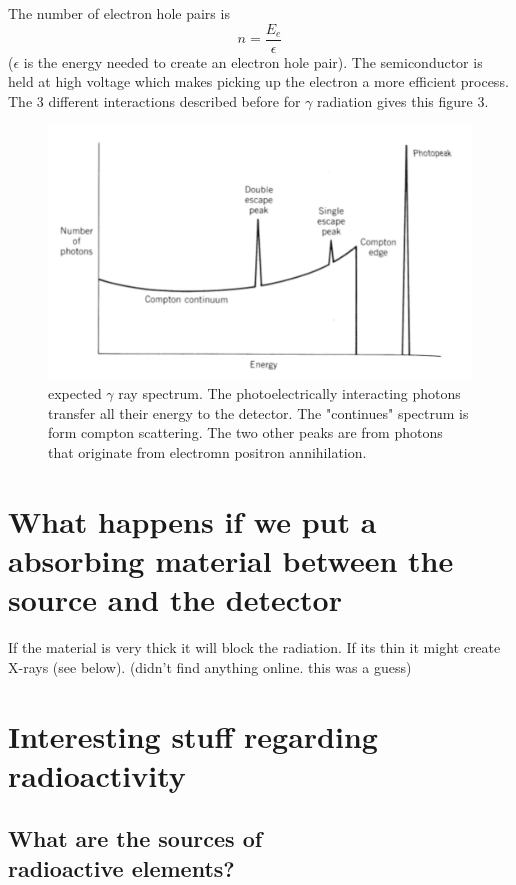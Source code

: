 \documentclass[]{article}
\begin{document}
The number of electron hole pairs is $$n=\frac{E_e}{\epsilon}$$ ($\epsilon$ is the energy needed to create an electron hole pair). The semiconductor is held at high voltage which makes picking up the electron a more efficient process. The 3 different interactions described before for $\gamma$ radiation gives this figure 3.
\begin{figure}
	\includegraphics[width=\linewidth]{gamma-ray-spectrum.png}
	\caption{expected $\gamma$ ray spectrum. The photoelectrically interacting photons transfer all their energy to the detector. The "continues" spectrum is form compton scattering. The two other peaks are from photons that originate from electromn positron annihilation.}
	\label{fig:Effective gamma spectrum}
\end{figure}

\section{What happens if we put a \\ absorbing material between the source and the detector}

If the material is very thick it will block the radiation. If its thin it might create X-rays (see below). (didn't find anything online. this was a guess)

\section{Interesting stuff regarding \\ radioactivity}
\subsection{What are the sources of \\ radioactive elements?}
\end{document}
